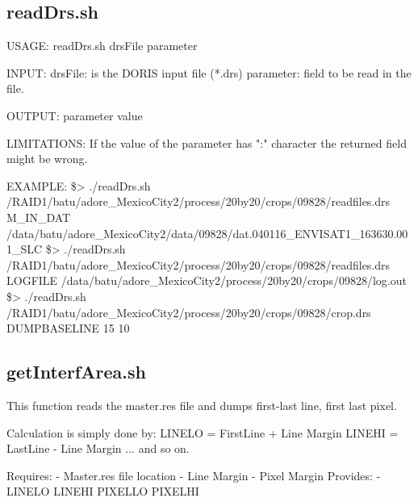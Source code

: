 \documentclass[letterpaper,10pt]{article}
\begin{document}
\subsection{readDrs.sh}
USAGE: readDrs.sh drsFile parameter

INPUT:
  drsFile: is the DORIS input file (*.drs)
  parameter: field to be read in the file. 

OUTPUT: 
  parameter value

LIMITATIONS:
If the value of the parameter has ":" character the returned field might be wrong.

EXAMPLE:
	\$> ./readDrs.sh /RAID1/batu/adore_MexicoCity2/process/20by20/crops/09828/readfiles.drs M_IN_DAT
	/data/batu/adore_MexicoCity2/data/09828/dat.040116_ENVISAT1_163630.001_SLC
	\$> ./readDrs.sh /RAID1/batu/adore_MexicoCity2/process/20by20/crops/09828/readfiles.drs LOGFILE
	/data/batu/adore_MexicoCity2/process/20by20/crops/09828/log.out
	\$> ./readDrs.sh /RAID1/batu/adore_MexicoCity2/process/20by20/crops/09828/crop.drs DUMPBASELINE
	15 10
\subsection{getInterfArea.sh}
 This function reads the master.res file and 
 dumps first-last line, first last pixel.

 Calculation is simply done by:
 LINELO = FirstLine + Line Margin
 LINEHI = LastLine - Line Margin
 ... and so on.

 Requires:
	- Master.res file location
	- Line Margin
	- Pixel Margin
 Provides:
	- LINELO LINEHI PIXELLO PIXELHI


%
%
\end{document}
